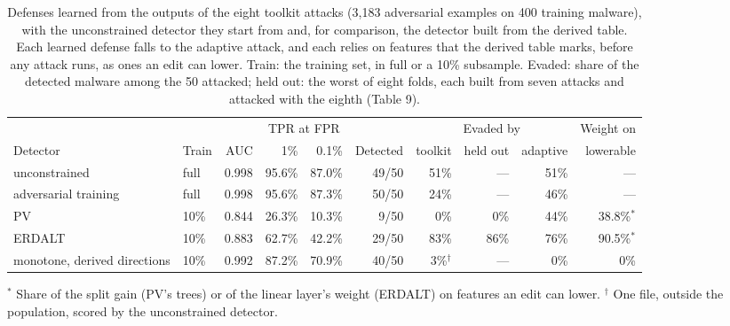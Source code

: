 \documentclass[sigconf,anonymous,acmthm=false]{acmart}
\newcommand{\tnotes}[1]{\par\smallskip\parbox{\linewidth}{\raggedright\footnotesize #1}}
\begin{document}
\begin{table}[t]
  \caption{Defenses learned from the outputs of the eight toolkit attacks (3,183 adversarial examples on 400 training
  malware), with the unconstrained detector they start from and, for comparison, the detector built from the derived
  table. Each learned defense falls to the adaptive attack, and each relies on features that the derived table marks,
  before any attack runs, as ones an edit can lower. Train: the training set, in full or a 10\% subsample. Evaded:
  share of the detected malware among the 50 attacked; held out: the worst of eight folds, each built from seven
  attacks and attacked with the eighth (Table 9).}
  \label{tab:observed}
  \small
  \begin{tabular}{@{}llrrrrrrrr@{}}
    \toprule
    & & & \multicolumn{2}{c}{TPR at FPR} & & \multicolumn{3}{c}{Evaded by} & Weight on \\
    \cmidrule(lr){4-5} \cmidrule(lr){7-9}
    Detector & Train & AUC & 1\% & 0.1\% & Detected & toolkit & held out & adaptive & lowerable \\
    \midrule
    unconstrained & full & 0.998 & 95.6\% & 87.0\% & 49/50 & 51\% & --- & 51\% & --- \\
    adversarial training & full & 0.998 & 95.6\% & 87.3\% & 50/50 & 24\% & --- & 46\% & --- \\
    PV & 10\% & 0.844 & 26.3\% & 10.3\% & 9/50 & 0\% & 0\% & 44\% & 38.8\%$^\ast$ \\
    ERDALT & 10\% & 0.883 & 62.7\% & 42.2\% & 29/50 & 83\% & 86\% & 76\% & 90.5\%$^\ast$ \\
    \midrule
    monotone, derived directions & 10\% & 0.992 & 87.2\% & 70.9\% & 40/50 & 3\%$^\dagger$ & --- & 0\% & 0\% \\
    \bottomrule
  \end{tabular}
  \tnotes{$^\ast$ Share of the split gain (PV's trees) or of the linear layer's weight (ERDALT) on features an edit can
  lower. $^\dagger$ One file, outside the population, scored by the unconstrained detector.}
\end{table}
\end{document}
